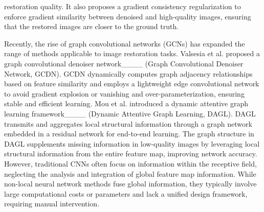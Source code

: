 restoration quality. It also proposes a gradient consistency regularization to enforce gradient similarity between denoised and high-quality images, ensuring that the restored images are closer to the ground truth.

Recently, the rise of graph convolutional networks (GCNs) has expanded the range of methods applicable to image restoration tasks. Valsesia et al. proposed a graph convolutional denoiser network____ (Graph Convolutional Denoiser Network, GCDN). GCDN dynamically computes graph adjacency relationships based on feature similarity and employs a lightweight edge convolutional network to avoid gradient explosion or vanishing and over-parameterization, ensuring stable and efficient learning. Mou et al. introduced a dynamic attentive graph learning framework____ (Dynamic Attentive Graph Learning, DAGL). DAGL transmits and aggregates local structural information through a graph network embedded in a residual network for end-to-end learning. The graph structure in DAGL supplements missing information in low-quality images by leveraging local structural information from the entire feature map, improving network accuracy. However, traditional CNNs often focus on information within the receptive field, neglecting the analysis and integration of global feature map information. While non-local neural network methods fuse global information, they typically involve large computational costs or parameters and lack a unified design framework, requiring manual intervention.